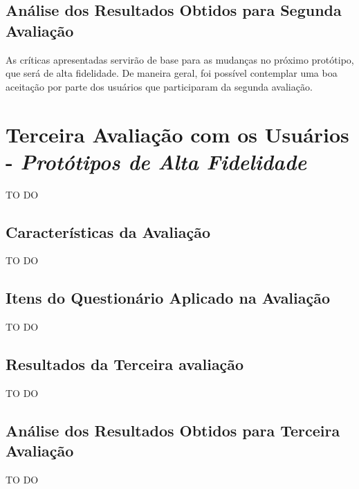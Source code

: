 		\subsection[Análise dos Resultados Obtidos para Segunda Avaliação]{Análise dos Resultados Obtidos para Segunda Avaliação}
		\label{sec:segundaAvaliacao_Analise}

			As críticas apresentadas servirão de base para as mudanças no próximo protótipo, que será de alta fidelidade. De maneira geral, foi possível contemplar uma boa aceitação por parte dos usuários que participaram da segunda avaliação.

	\section[Terceira Avaliação com os Usuários - Protótipos de Alta Fidelidade]{Terceira Avaliação com os Usuários - \emph{Protótipos de Alta Fidelidade}}
	\label{sec:avaliacaoPrototipos_Terceira}

		TO DO

		\subsection[Características da Avaliação]{Características da Avaliação}
		\label{sec:terceiraAvaliacao_Caracteristicas}

			TO DO

		\subsection[Itens do Questionário Aplicados na Avaliação]{Itens do Questionário Aplicado na Avaliação}
		\label{sec:terceiraAvaliacao_Questionario}

			TO DO

		\subsection[Resultados da Terceira Avaliação]{Resultados da Terceira avaliação}
		\label{sec:terceiraAvaliacao_Resultados}

			TO DO

		\subsection[Análise dos Resultados Obtidos para Terceira Avaliação]{Análise dos Resultados Obtidos para Terceira Avaliação}
		\label{sec:terceiraAvaliacao_Analise}

			TO DO






